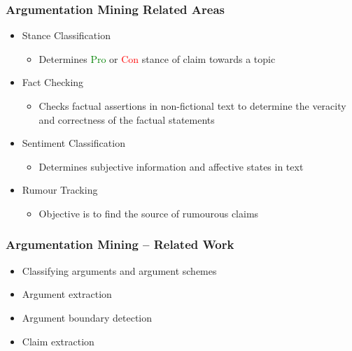 \documentclass{beamer}
\begin{document}
\begin{frame}
\frametitle{Argumentation Mining Related Areas}

\begin{itemize}
	\item Stance Classification \cite{anand2011cats, mohammad2016semeval}
	\begin{itemize}
		\item Determines \textcolor{green}{Pro} or \textcolor{red}{Con} stance of claim towards a topic
	\end{itemize}
\item Fact Checking \cite{vlachos2014fact, ciampaglia2015computational}
	\begin{itemize}
		\item Checks factual assertions in non-fictional text to determine the
			veracity and correctness of the factual statements
	\end{itemize}
\item Sentiment Classification \cite{bakshi2016opinion, sobhani2016detecting}
	\begin{itemize}
		\item Determines subjective information and affective states in text
	\end{itemize}
\item Rumour Tracking \cite{gorrell2019semeval}
	\begin{itemize}
		\item Objective is to find the source of rumourous claims
	\end{itemize}
\end{itemize}

\end{frame}

\begin{frame}
	\frametitle{Argumentation Mining -- Related Work}
	\begin{itemize}
		\item Classifying arguments and argument schemes \cite{palau2009argumentation}
		\item Argument extraction \cite{hasan2014you}
		\item Argument boundary detection \cite{lippi2015context}
		\item Claim extraction \cite{levy2014context}
	\end{itemize}
\end{frame}
\end{document}
